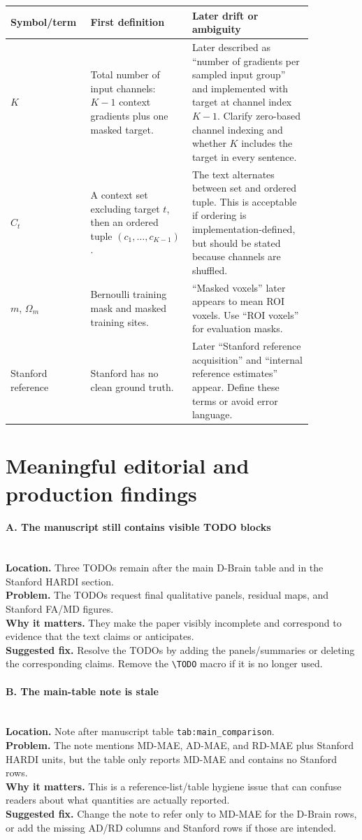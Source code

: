 \documentclass[11pt]{article}
\newcommand{\findingtitle}[1]{\paragraph{#1}\mbox{}\\}
\newcommand{\loc}[1]{\textbf{Location.} #1\\}
\newcommand{\problem}[1]{\textbf{Problem.} #1\\}
\newcommand{\why}[1]{\textbf{Why it matters.} #1\\}
\newcommand{\fix}[1]{\textbf{Suggested fix.} #1\par}
\begin{document}
\begin{center}
\small
\begin{tabular}{p{0.18\linewidth}p{0.31\linewidth}p{0.37\linewidth}}
\toprule
Symbol/term & First definition & Later drift or ambiguity \\
\midrule
$K$ & Total number of input channels: $K-1$ context gradients plus one masked target. & Later described as ``number of gradients per sampled input group'' and implemented with target at channel index $K-1$. Clarify zero-based channel indexing and whether $K$ includes the target in every sentence. \\
$C_t$ & A context set excluding target $t$, then an ordered tuple $(c_1,\ldots,c_{K-1})$. & The text alternates between set and ordered tuple. This is acceptable if ordering is implementation-defined, but should be stated because channels are shuffled. \\
$m$, $\Omega_m$ & Bernoulli training mask and masked training sites. & ``Masked voxels'' later appears to mean ROI voxels. Use ``ROI voxels'' for evaluation masks. \\
Stanford reference & Stanford has no clean ground truth. & Later ``Stanford reference acquisition'' and ``internal reference estimates'' appear. Define these terms or avoid error language. \\
\bottomrule
\end{tabular}
\end{center}

\section*{Meaningful editorial and production findings}

\findingtitle{A. The manuscript still contains visible TODO blocks}
\loc{Three TODOs remain after the main D-Brain table and in the Stanford HARDI section.}
\problem{The TODOs request final qualitative panels, residual maps, and Stanford FA/MD figures.}
\why{They make the paper visibly incomplete and correspond to evidence that the text claims or anticipates.}
\fix{Resolve the TODOs by adding the panels/summaries or deleting the corresponding claims. Remove the \texttt{\textbackslash TODO} macro if it is no longer used.}

\findingtitle{B. The main-table note is stale}
\loc{Note after manuscript table \texttt{tab:main\_comparison}.}
\problem{The note mentions MD-MAE, AD-MAE, and RD-MAE plus Stanford HARDI units, but the table only reports MD-MAE and contains no Stanford rows.}
\why{This is a reference-list/table hygiene issue that can confuse readers about what quantities are actually reported.}
\fix{Change the note to refer only to MD-MAE for the D-Brain rows, or add the missing AD/RD columns and Stanford rows if those are intended.}
\end{document}

